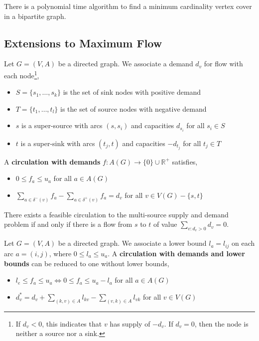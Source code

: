  	\begin{cor}
 		There is a polynomial time algorithm to find a minimum cardinality vertex cover in a bipartite graph.
 	\end{cor}

 	\subsection{Extensions to Maximum Flow}
 		\begin{defn}
 		Let $G = (V, A)$ be a directed graph. We associate a demand $d_v$ for flow with each node\footnote{If $d_v < 0$, this indicates that $v$ has supply of $-d_v$. If $d_v = 0$, then the node is neither a source nor a sink.},
 		\begin{itemize}
 			\item $S = \{s_1, \dots, s_k\}$ is the set of sink nodes with positive demand
 			\item $T = \{t_1, \dots, t_l\}$ is the set of source nodes with negative demand
 			\item $s$ is a super-source with arcs $(s,s_i)$ and capacities $d_{s_i}$ for all $s_i \in S$
 			\item $t$ is a super-sink with arcs $(t_j, t)$ and capacities $-d_{t_j}$ for all $t_j \in T$
 		\end{itemize}
 		\noindent A \textbf{circulation with demands} $f: A(G) \rightarrow \{0\} \cup \mathbb{R}^+$ satisfies,
 		\begin{itemize}
 			\item $0 \leq f_a \leq u_a$ for all $a \in A(G)$
 			\item $\sum_{a \in \delta^-(v)} f_a - \sum_{a \in \delta^+(v)} f_a = d_v$ for all $v \in V(G) - \{s,t\}$
 		\end{itemize}
 		\noindent There exists a feasible circulation to the multi-source supply and demand problem if and only if there is a flow from $s$ to $t$ of value $\sum_{v:d_v > 0} d_v = 0$.
 	\end{defn}

	\begin{defn}
 		Let $G = (V, A)$ be a directed graph. We associate a lower bound $l_a = l_{ij}$ on each arc $a = (i,j)$, where $0 \leq l_a \leq u_a$. A \textbf{circulation with demands and lower bounds} can be reduced to one without lower bounds,
 		\begin{itemize}
 			\item $l_e \leq f_a \leq u_a \iff 0 \leq f_a \leq u_a - l_a$ for all $a \in A(G)$
 			\item $d_v^* = d_v + \sum_{(k,v) \in A} l_{kv} - \sum_{(v,k) \in A} l_{vk}$ for all $v \in V(G)$
 		\end{itemize}
 	\end{defn}

